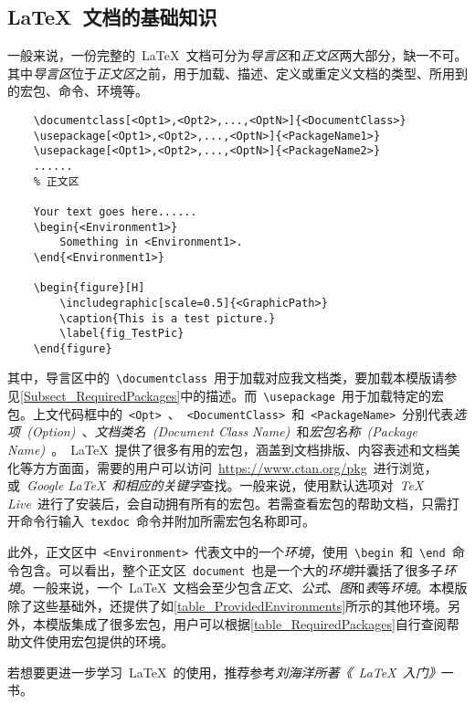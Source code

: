 \subsection{\LaTeX~文档的基础知识}
\label{Subsect_LaTeXBasics}
一般来说，一份完整的~\LaTeX~文档可分为\emph{导言区}和\emph{正文区}两大部分，缺一不可。其中\emph{导言区}位于\emph{正文区}之前，用于加载、描述、定义或重定义文档的类型、所用到的宏包、命令、环境等。
\begin{Verbatim}[gobble=1,frame=single]
	% 导言区
	\documentclass[<Opt1>,<Opt2>,...,<OptN>]{<DocumentClass>}
	\usepackage[<Opt1>,<Opt2>,...,<OptN>]{<PackageName1>}
	\usepackage[<Opt1>,<Opt2>,...,<OptN>]{<PackageName2>}
	......
	% 正文区
	
	Your text goes here......
	\begin{<Environment1>}
		Something in <Environment1>.
	\end{<Environment1>}

	\begin{figure}[H]
		\includegraphic[scale=0.5]{<GraphicPath>}
		\caption{This is a test picture.}
		\label{fig_TestPic}
	\end{figure}

\end{Verbatim}


其中，导言区中的~\verb|\documentclass|~用于加载对应我文档类，要加载本模版请参见\cref{Subsect_RequiredPackages}中的描述。而~\verb|\usepackage|~用于加载特定的宏包。上文代码框中的~\verb|<Opt>|~、~\verb|<DocumentClass>|~和~\verb|<PackageName>|~分别代表\emph{选项~(Option)~}、\emph{文档类名~(Document Class Name)~}和\emph{宏包名称~(Package Name)~}。~\LaTeX~提供了很多有用的宏包，涵盖到文档排版、内容表述和文档美化等方方面面，需要的用户可以访问~\url{https://www.ctan.org/pkg}~进行浏览，或\emph{~Google LaTeX~和相应的关键字}查找。一般来说，使用默认选项对~\emph{TeX Live}~进行了安装后，会自动拥有所有的宏包。若需查看宏包的帮助文档，只需打开命令行输入~\verb|texdoc|~命令并附加所需宏包名称即可。


此外，正文区中~\verb|<Environment>|~代表文中的一个\emph{环境}，使用~\verb|\begin|~和~\verb|\end|~命令包含。可以看出，整个正文区~\verb|document|~也是一个大的\emph{环境}并囊括了很多子\emph{环境}。一般来说，一个~\LaTeX~文档会至少包含\emph{正文}、\emph{公式}、\emph{图}和\emph{表}等\emph{环境}。本模版除了这些基础外，还提供了如\cref{table_ProvidedEnvironments}所示的其他环境。另外，本模版集成了很多宏包，用户可以根据\cref{table_RequiredPackages}自行查阅帮助文件使用宏包提供的环境。


若想要更进一步学习~\LaTeX~的使用，推荐参考\emph{刘海洋所著《~\LaTeX~入门》}一书\cite{Book_LaTeXIntro}。

